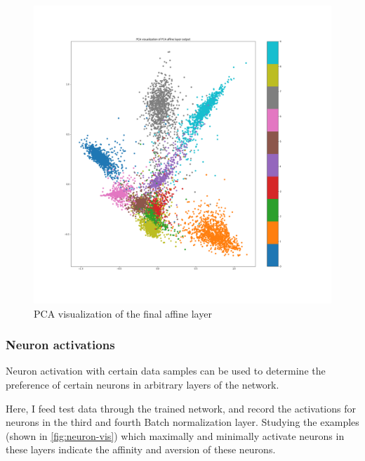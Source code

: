 \documentclass[10pt,twocolumn,letterpaper]{article}
\begin{document}
\begin{figure}%
\centering
\includegraphics[scale=0.15]{images/1-fc-mnist/pca_fc4_output}
\caption{PCA visualization of the final affine layer}
\label{fig:pca}
\end{figure}


\subsubsection{Neuron activations}

Neuron activation with certain data samples can be used to determine the preference of certain neurons in arbitrary layers of the network. 

Here, I feed test data through the trained network, and record the activations for neurons in the third and fourth Batch normalization \cite{ioffe2015batch} layer. Studying the examples (shown in \ref{fig:neuron-vis}) which maximally and minimally activate neurons in these layers indicate the affinity and aversion of these neurons.
\end{document}
